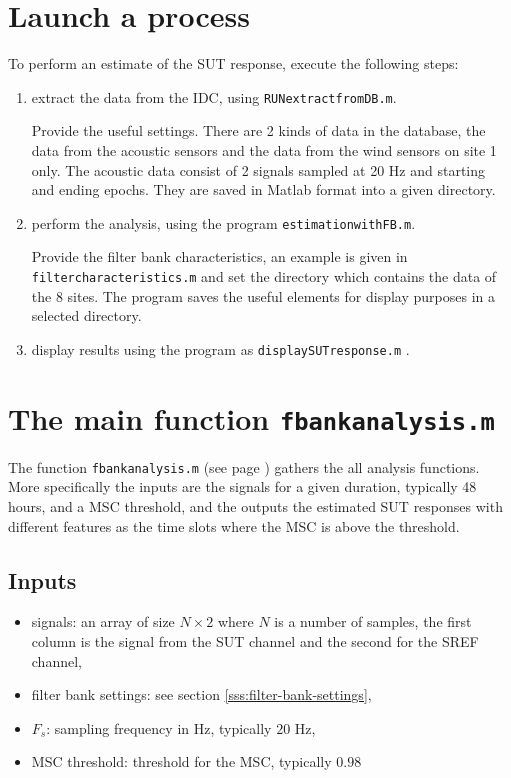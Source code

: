 

\section{Launch a process}
To perform an estimate of the SUT response, execute the following steps:
\begin{enumerate}
\item
extract the data from the IDC, using {\tt RUNextractfromDB.m}. 
 
Provide the useful settings. There are 2 kinds of data in the database, the data from the acoustic sensors and the data from the wind sensors on site 1 only. The acoustic data consist of 2 signals sampled at 20 Hz and starting and ending epochs. They are saved in Matlab format into a given directory. 
\item
perform the analysis, using the program {\tt estimationwithFB.m}.

Provide the filter bank characteristics, an example is given in {\tt filtercharacteristics.m} and set the directory which contains the data of the $8$ sites. The program saves the useful elements for display purposes in a selected directory.
 \item
display results using the program as {\tt displaySUTresponse.m} .

\end{enumerate}


\section{The main function {\tt fbankanalysis.m}}
The function {\tt fbankanalysis.m} (see page \pageref{s:fbankanalysis})  gathers the all analysis functions. More specifically the inputs are the signals for a given duration, typically 48 hours, and a MSC threshold, and the outputs the estimated SUT responses with different features as the time slots where the MSC is above the  threshold.

\subsection{Inputs}
\begin{itemize}
\item
signals: an array of size $N\times 2$ where $N$ is a number of samples, the first column is the signal from the SUT channel and the second for the SREF channel,
\item
filter bank settings: see section \ref{sss:filter-bank-settings},
\item
$F_s$: sampling frequency in Hz, typically $20$ Hz,
\item
MSC threshold: threshold for the MSC, typically $0.98$
\end{itemize}

